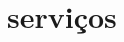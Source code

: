 \section{\textbf{serviços}}
\label{sec: Caade}

\begin{commentA}
	
	\par \end{commentA}

\begin{commentB}
	
	\par \end{commentB}
 



